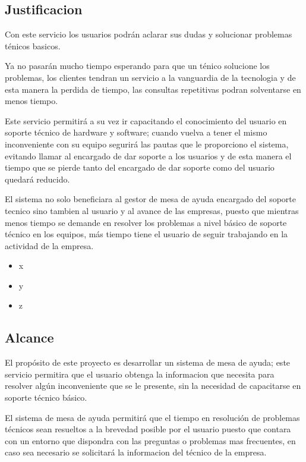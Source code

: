 \documentclass[preprint,12pt]{elsarticle}
\begin{document}

\subsection {\textbf{Justificacion}}

Con este servicio los usuarios podrán aclarar sus dudas y solucionar problemas ténicos basicos.

Ya no pasarán mucho tiempo esperando para que un ténico solucione los problemas, los clientes tendran un servicio a la vanguardia de la tecnologia y de esta manera la perdida de tiempo, las consultas repetitivas podran solventarse en menos tiempo.

Este servicio permitirá a su vez ir capacitando el conocimiento del usuario en soporte técnico de hardware y software; cuando vuelva a tener el mismo inconveniente con su equipo segurirá las pautas que le proporciono el sistema, evitando llamar al encargado de dar soporte a los usuarios y de esta manera el tiempo que se pierde tanto del encargado de dar soporte como del usuario quedará reducido.

El sistema no solo beneficiara al gestor de mesa de ayuda encargado del soporte tecnico sino tambien al usuario y al avance de las empresas, puesto que mientras menos tiempo se demande en resolver los problemas a nivel básico de soporte técnico en los equipos, más tiempo tiene el usuario de seguir trabajando en la actividad de la empresa.

\cite{Gartner} 

\begin{itemize}
	\item x
	\item y
	\item z
\end{itemize}


\subsection {\textbf{Alcance}}
El propósito de este proyecto es desarrollar un sistema de mesa de ayuda; este servicio permitira que el usuario obtenga la informacion que necesita para resolver algún inconveniente que se le presente, sin la necesidad de capacitarse en soporte técnico básico.

El sistema de mesa de ayuda permitirá que el tiempo en resolución de problemas técnicos sean resueltos a la brevedad posible por el usuario puesto que contara con un entorno que dispondra con las preguntas o problemas mas frecuentes, en caso sea necesario se solicitará la informacion del técnico de la empresa.
\end{document}
